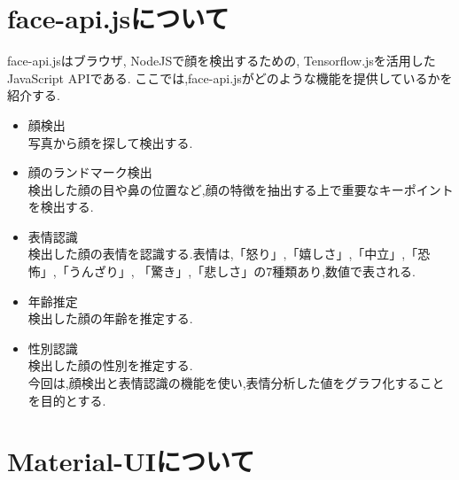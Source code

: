\section{face-api.jsについて}
\label{sec:reference_bib}
face-api.jsはブラウザ, NodeJSで顔を検出するための,
Tensorflow.jsを活用したJavaScript APIである.
ここでは,face-api.jsがどのような機能を提供しているかを紹介する.
\begin{itemize}
	\item 顔検出 \\
	写真から顔を探して検出する. \\

	\item 顔のランドマーク検出 \\
	検出した顔の目や鼻の位置など,顔の特徴を抽出する上で重要なキーポイントを検出する. \\

	\item 表情認識 \\
	検出した顔の表情を認識する.表情は,「怒り」,「嬉しさ」,「中立」,「恐怖」,「うんざり」,
	「驚き」,「悲しさ」の7種類あり,数値で表される. \\

	\item 年齢推定 \\
	検出した顔の年齢を推定する. \\

	\item 性別認識 \\
	検出した顔の性別を推定する. \\

	今回は,顔検出と表情認識の機能を使い,表情分析した値をグラフ化することを目的とする.
\end{itemize}
	
\section{Material-UIについて}
\label{sec:reference_chapter}

